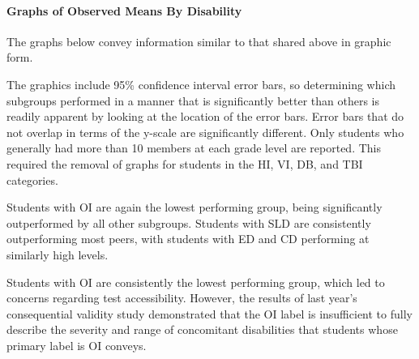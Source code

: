 \documentclass[]{article}
\let\oldparagraph\paragraph
\renewcommand{\paragraph}[1]{\oldparagraph{#1}\mbox{}}
\begin{document}
\clearpage

\paragraph{Graphs of Observed Means By
Disability}\label{graphs-of-observed-means-by-disability}

The graphs below convey information similar to that shared above in
graphic form.

The graphics include 95\% confidence interval error bars, so determining
which subgroups performed in a manner that is significantly better than
others is readily apparent by looking at the location of the error bars.
Error bars that do not overlap in terms of the y-scale are significantly
different. Only students who generally had more than 10 members at each
grade level are reported. This required the removal of graphs for
students in the HI, VI, DB, and TBI categories.

Students with OI are again the lowest performing group, being
significantly outperformed by all other subgroups. Students with SLD are
consistently outperforming most peers, with students with ED and CD
performing at similarly high levels.

Students with OI are consistently the lowest performing group, which led
to concerns regarding test accessibility. However, the results of last
year's consequential validity study demonstrated that the OI label is
insufficient to fully describe the severity and range of concomitant
disabilities that students whose primary label is OI conveys.
\end{document}
